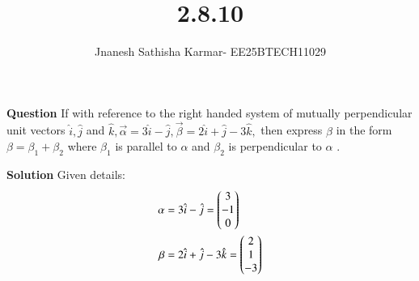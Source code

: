 \documentclass[journal]{IEEEtran}
\theoremstyle{remark}
\begin{document}
\setlength{\abovedisplayskip}{0pt}
\setlength{\belowdisplayskip}{0pt}
\setlength{\abovedisplayshortskip}{0pt}
\setlength{\belowdisplayshortskip}{0pt}

\onecolumn

\title{2.8.10}
\author{Jnanesh Sathisha Karmar- EE25BTECH11029}
\maketitle


\renewcommand{\thefigure}{\theenumi}
\renewcommand{\thetable}{\theenumi}
\textbf{Question} If with reference to the right handed system of mutually perpendicular unit vectors
$\hat{i},\hat{j}$ and $\hat{k}, \vec{\alpha} = 3\hat{i}-\hat{j},\vec{\beta} = 2\hat{i} +\hat{j} - 3\hat{k},$ then express $\beta$ in the form $\beta =\beta_1 +\beta_2$ where $\beta_1$ is parallel to $\alpha$ and $\beta_2$ is perpendicular to $\alpha$ .

\textbf{Solution}
Given details:
\begin{align}
    \mathbf{\alpha} &= 3\hat{i}-\hat{j}=\begin{pmatrix}3 \\ -1\\0\end{pmatrix}\\\mathbf{\beta} &= 2\hat{i} +\hat{j} - 3\hat{k}=\begin{pmatrix}2\\1\\-3\end{pmatrix}
\end{align}
\end{document}
